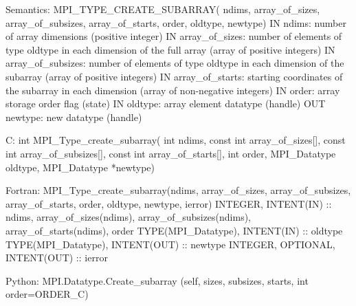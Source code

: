 Semantics:
MPI_TYPE_CREATE_SUBARRAY(
    ndims, array_of_sizes, array_of_subsizes,
    array_of_starts, order, oldtype, newtype)
IN ndims: number of array dimensions (positive integer)
IN array_of_sizes: number of elements of type oldtype in each dimension
    of the full array (array of positive integers)
IN array_of_subsizes: number of elements of type oldtype in each
    dimension of the subarray (array of positive integers)
IN array_of_starts: starting coordinates of the subarray in each
    dimension (array of non-negative integers)
IN order: array storage order flag (state)
IN oldtype: array element datatype (handle)
OUT newtype: new datatype (handle)

C:
int MPI_Type_create_subarray(
    int ndims, const int array_of_sizes[],
    const int array_of_subsizes[], const int array_of_starts[],
    int order, MPI_Datatype oldtype, MPI_Datatype *newtype)

Fortran:
MPI_Type_create_subarray(ndims, array_of_sizes, array_of_subsizes,
    array_of_starts, order, oldtype, newtype, ierror)
INTEGER, INTENT(IN) :: ndims, array_of_sizes(ndims),
    array_of_subsizes(ndims), array_of_starts(ndims), order
TYPE(MPI_Datatype), INTENT(IN) :: oldtype
TYPE(MPI_Datatype), INTENT(OUT) :: newtype
INTEGER, OPTIONAL, INTENT(OUT) :: ierror

Python:
MPI.Datatype.Create_subarray
   (self, sizes, subsizes, starts, int order=ORDER_C)
